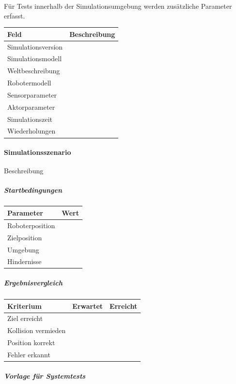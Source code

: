 \documentclass[
  a4paper,
  12pt,
  DIV=12,        %
  parskip=half,  %
  headings=small %
]{scrartcl}
\theoremstyle{definition}
\theoremstyle{definition}
\begin{document}
Für Tests innerhalb der Simulationsumgebung werden zusätzliche Parameter
erfasst.

\begin{longtable}[]{@{}ll@{}}
\toprule\noalign{}
Feld & Beschreibung \\
\midrule\noalign{}
\endhead
\bottomrule\noalign{}
\endlastfoot
Simulationsversion & \\
Simulationsmodell & \\
Weltbeschreibung & \\
Robotermodell & \\
Sensorparameter & \\
Aktorparameter & \\
Simulationszeit & \\
Wiederholungen & \\
\end{longtable}

\paragraph{Simulationsszenario}\label{simulationsszenario}

Beschreibung

\subparagraph{Startbedingungen}\label{startbedingungen}

\begin{longtable}[]{@{}ll@{}}
\toprule\noalign{}
Parameter & Wert \\
\midrule\noalign{}
\endhead
\bottomrule\noalign{}
\endlastfoot
Roboterposition & \\
Zielposition & \\
Umgebung & \\
Hindernisse & \\
\end{longtable}

\subparagraph{Ergebnisvergleich}\label{ergebnisvergleich}

\begin{longtable}[]{@{}lll@{}}
\toprule\noalign{}
Kriterium & Erwartet & Erreicht \\
\midrule\noalign{}
\endhead
\bottomrule\noalign{}
\endlastfoot
Ziel erreicht & & \\
Kollision vermieden & & \\
Position korrekt & & \\
Fehler erkannt & & \\
\end{longtable}

\subparagraph{Vorlage für Systemtests}\label{vorlage-fuxfcr-systemtests}
\end{document}
